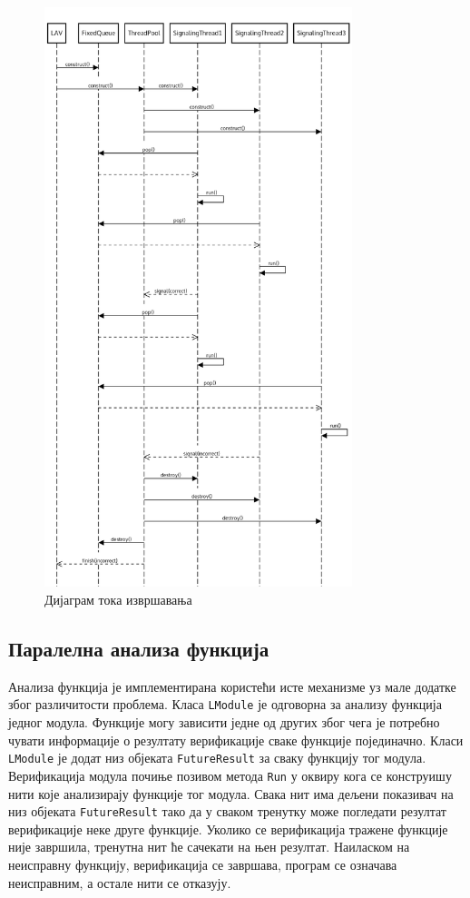 \documentclass[12pt,oneside]{memoir}
\begin{document}
\begin{figure}[!ht]
  \centering
  \includegraphics[width=0.8\textwidth]{seq_diag.png}
  \caption{Дијаграм тока извршавања}
  \label{fig:sekv_dij}
\end{figure}

\subsection{Паралелна анализа функција}

Анализа функција је имплементирана користећи исте механизме уз мале додатке због различитости проблема. Класа \texttt{LModule} је одговорна за анализу функција једног модула. Функције могу зависити једне од других због чега је потребно чувати информације о резултату верификације сваке функције појединачно. Класи \texttt{LModule} је додат низ објеката \texttt{FutureResult} за сваку функцију тог модула. Верификација модула почиње позивом метода \texttt{Run} у оквиру кога се конструишу нити које анализирају функције тог модула. Свака нит има дељени показивач на низ објеката \texttt{FutureResult} тако да у сваком тренутку може погледати резултат верификације неке друге функције. Уколико се верификација тражене функције није завршила, тренутна нит ће сачекати на њен резултат. Наиласком на неисправну функцију, верификација се завршава, програм се означава неисправним, а остале нити се отказују. 
\end{document}
